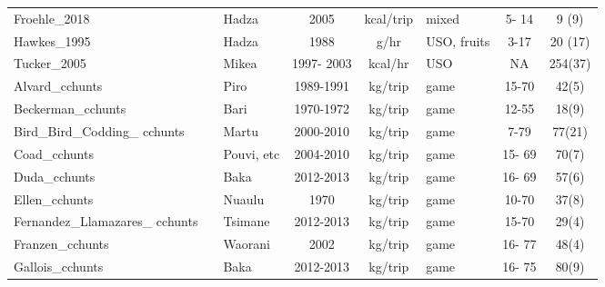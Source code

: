 \begin{landscape}
\begin{longtable}{M{2.6cm} M{3.6cm} M{1.5cm} c c M{1cm} c c}
Froehle\_2018                  & \cite{froehle_physical_2019}              & Hadza           & 2005       & kcal/trip & mixed              & 5- 14   & 9 (9)       \\
Hawkes\_1995                   & \cite{hawkes_hadza_1995}                  & Hadza           & 1988       & g/hr      & USO, fruits        & 3-17    & 20 (17)     \\
Tucker\_2005                   & \cite{tucker_growing_2005}                & Mikea           & 1997- 2003 & kcal/hr   & USO                & NA      & 254(37)     \\
Alvard\_cchunts                & \cite{alvard_shotguns_1995}               & Piro            & 1989-1991  & kg/trip   & game               & 15-70   & 42(5)     \\%
Beckerman\_cchunts             & \cite{beckerman_ecology_2013}             & Bari            & 1970-1972  & kg/trip   & game               & 12-55   & 18(9)    \\%
Bird\_Bird\_Codding\_ cchunts     & \cite{bird_pursuit_2009}                  & Martu           & 2000-2010  & kg/trip   & game               & 7-79    & 77(21)     \\%
Coad\_cchunts                  & \cite{coad_bushmeat_2008}                 & Pouvi, etc    & 2004-2010  & kg/trip   & game               & 15- 69  & 70(7)     \\%
Duda\_cchunts                  & \cite{reyes-garcia_adaptive_2016}         & Baka            & 2012-2013  & kg/trip   & game               & 16- 69  & 57(6)      \\%
Ellen\_cchunts                 & \cite{ellen_individual_1996}              & Nuaulu          & 1970       & kg/trip   & game               & 10-70   & 37(8)     \\%
Fernandez\_Llamazares\_ cchunts  & \cite{reyes-garcia_adaptive_2016}         & Tsimane         & 2012-2013  & kg/trip   & game               & 15-70   & 29(4)     \\%
Franzen\_cchunts               & \cite{franzen_evaluating_2006}            & Waorani         & 2002       & kg/trip   & game               & 16- 77  & 48(4)      \\%
Gallois\_cchunts               & \cite{reyes-garcia_adaptive_2016}         & Baka            & 2012-2013  & kg/trip   & game               & 16- 75  & 80(9)     \\%

\end{longtable}
\end{landscape}
